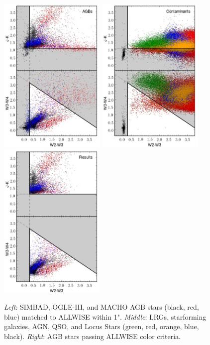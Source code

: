 \begin{figure}
\includegraphics[width=2in]{figs/sampleboundaries.jpg}
\includegraphics[width=2in]{figs/contamboundaries.jpg}
\includegraphics[width=2in]{figs/sample_results.jpg}
\caption{\emph{Left}: SIMBAD, OGLE-III, and MACHO AGB stars (black, red, blue) matched to ALLWISE within 1". \emph{Middle}: LRGs, starforming galaxies, AGN, QSO, and Locus Stars (green, red, orange, blue, black). \emph{Right}: AGB stars passing ALLWISE color criteria.}
\label{fig:boundaries}
\end{figure}


